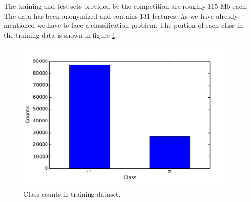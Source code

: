 \documentclass[conference, onecolumn]{IEEEtran}
\begin{document}
The training and test sets provided by the competition are roughly 115 Mb each. The data has been anonymized and contains 131 features. As we have already mentioned we have to face a classification problem. The portion of each class in the training data is shown in figure \ref{fig_de1}.


\begin{figure}[ht]
\centering
\includegraphics[width=5in, height=3in]{plot_de1.pdf}
\caption{Class counts in training dataset.}
\label{fig_de1}
\end{figure}
\end{document}
